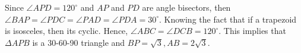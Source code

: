 \documentclass[12pt,paper=letter]{scrartcl}
\begin{document}
Since $\angle APD = 120^{\circ}$ and $AP$ and $PD$ are angle bisectors, then $\angle BAP = \angle PDC = \angle PAD = \angle PDA = 30^{\circ} $. Knowing the fact that if a trapezoid is isosceles, then its cyclic. Hence, $\angle ABC = \angle DCB = 120^{\circ}$. This implies that $\Delta APB$ is a 30-60-90 triangle and $BP = \sqrt{3}, AB = 2\sqrt{3}.$

\begin{center}
 



\begin{tikzpicture}[x=0.75pt,y=0.75pt,yscale=-1,xscale=1]


\end{tikzpicture}
\end{center}
\end{document}
